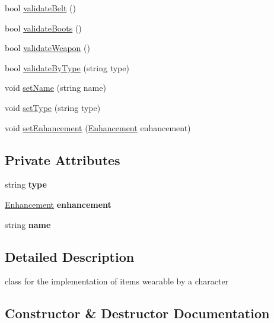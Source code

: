 \begin{DoxyCompactItemize}
\item 
bool \hyperlink{class_item_a324285b377b1f21ec77381f16d406517}{validate\+Belt} ()
\item 
bool \hyperlink{class_item_a0139f295ddb22a4d84d4a514fe944d5c}{validate\+Boots} ()
\item 
bool \hyperlink{class_item_affb352894ddbc04bc0bb1b1ca3ac2cf1}{validate\+Weapon} ()
\item 
bool \hyperlink{class_item_a441910e3bbac14b7a37fbc4aa47283a6}{validate\+By\+Type} (string type)
\item 
void \hyperlink{class_item_a5dcdff1db4c66ca22bd6a3f826c69644}{set\+Name} (string name)
\item 
void \hyperlink{class_item_a1712084c3f4a335526c027f0aa0f862a}{set\+Type} (string type)
\item 
void \hyperlink{class_item_a7f9dd7e7d5272a4c3bfa72798087ef37}{set\+Enhancement} (\hyperlink{class_enhancement}{Enhancement} enhancement)
\end{DoxyCompactItemize}
\subsection*{Private Attributes}
\begin{DoxyCompactItemize}
\item 
\hypertarget{class_item_a5fddc3cf5f552ab8f5cceacaba430474}{}\label{class_item_a5fddc3cf5f552ab8f5cceacaba430474} 
string {\bfseries type}
\item 
\hypertarget{class_item_a5b8cbbd75513de64c90f92cdabc79602}{}\label{class_item_a5b8cbbd75513de64c90f92cdabc79602} 
\hyperlink{class_enhancement}{Enhancement} {\bfseries enhancement}
\item 
\hypertarget{class_item_a406cde7962a6b42a66b4a53c9a26db2c}{}\label{class_item_a406cde7962a6b42a66b4a53c9a26db2c} 
string {\bfseries name}
\end{DoxyCompactItemize}


\subsection{Detailed Description}
class for the implementation of items wearable by a character 

\subsection{Constructor \& Destructor Documentation}
\hypertarget{class_item_acbc343f7e61d21ae704ef4174c719604}{}\label{class_item_acbc343f7e61d21ae704ef4174c719604} 
